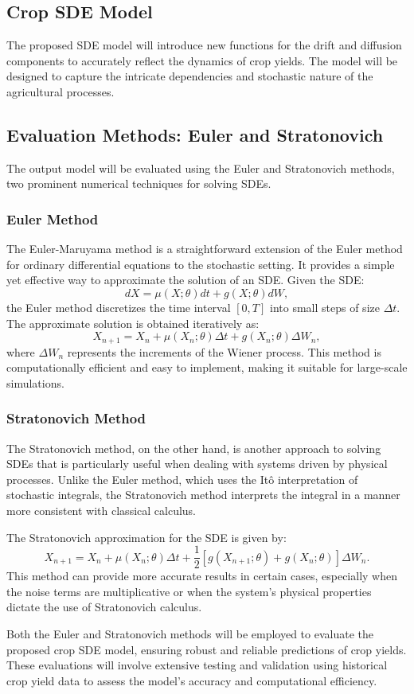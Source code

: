 \subsection*{Crop SDE Model}
The proposed SDE model will introduce new functions for the drift and diffusion components to accurately reflect the dynamics of crop yields. The model will be designed to capture the intricate dependencies and stochastic nature of the agricultural processes.

\subsection*{Evaluation Methods: Euler and Stratonovich}
The output model will be evaluated using the Euler and Stratonovich methods, two prominent numerical techniques for solving SDEs.

\subsubsection*{Euler Method}
The Euler-Maruyama method is a straightforward extension of the Euler method for ordinary differential equations to the stochastic setting. It provides a simple yet effective way to approximate the solution of an SDE. Given the SDE:
\[
dX = \mu(X;\theta)dt + g(X;\theta)dW,
\]
the Euler method discretizes the time interval $[0, T]$ into small steps of size $\Delta t$. The approximate solution is obtained iteratively as:
\[
X_{n+1} = X_n + \mu(X_n;\theta)\Delta t + g(X_n;\theta)\Delta W_n,
\]
where $\Delta W_n$ represents the increments of the Wiener process. This method is computationally efficient and easy to implement, making it suitable for large-scale simulations.

\subsubsection*{Stratonovich Method}
The Stratonovich method, on the other hand, is another approach to solving SDEs that is particularly useful when dealing with systems driven by physical processes. Unlike the Euler method, which uses the Itô interpretation of stochastic integrals, the Stratonovich method interprets the integral in a manner more consistent with classical calculus.

The Stratonovich approximation for the SDE is given by:
\[
X_{n+1} = X_n + \mu(X_n;\theta)\Delta t + \frac{1}{2} \left[ g(X_{n+1};\theta) + g(X_n;\theta) \right] \Delta W_n.
\]
This method can provide more accurate results in certain cases, especially when the noise terms are multiplicative or when the system's physical properties dictate the use of Stratonovich calculus.

Both the Euler and Stratonovich methods will be employed to evaluate the proposed crop SDE model, ensuring robust and reliable predictions of crop yields. These evaluations will involve extensive testing and validation using historical crop yield data to assess the model's accuracy and computational efficiency.
